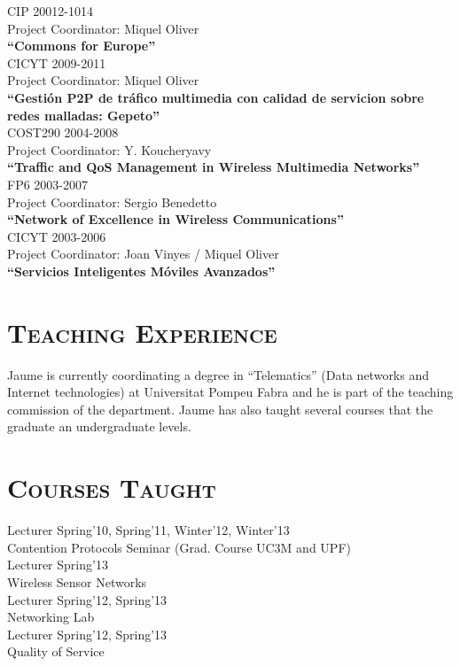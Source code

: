 \documentclass[line,margin]{res}
\begin{document}
\begin{resume}
\hfill {CIP 20012-1014} \\
Project Coordinator: Miquel Oliver\\
\textbf{``Commons for Europe''}\\

\hfill {CICYT 2009-2011} \\
Project Coordinator: Miquel Oliver\\
\textbf{``Gestión P2P de tráfico multimedia con calidad de servicion sobre redes malladas: Gepeto''}\\

\hfill {COST290 2004-2008} \\
Project Coordinator: Y. Koucheryavy\\
\textbf{``Traffic and QoS Management in Wireless Multimedia Networks''}\\

\hfill {FP6 2003-2007} \\
Project Coordinator: Sergio Benedetto\\
\textbf{``Network of Excellence in Wireless Communications''}\\

\hfill {CICYT 2003-2006} \\
Project Coordinator: Joan Vinyes / Miquel Oliver\\
\textbf{``Servicios Inteligentes Móviles Avanzados''}\\

\section{\textsc{Teaching Experience}}
Jaume is currently coordinating a degree in ``Telematics'' (Data networks and Internet technologies) at Universitat Pompeu Fabra and he is part of the teaching commission of the department. Jaume has also taught several courses that the graduate an undergraduate levels.

\section{\textsc{Courses Taught}}
Lecturer
\hfill {Spring'10, Spring'11, Winter'12, Winter'13}\\
Contention Protocols Seminar (Grad. Course UC3M and UPF)\\
\newline
Lecturer
\hfill {Spring'13}\\
Wireless Sensor Networks\\
\newline
Lecturer
\hfill {Spring'12, Spring'13}\\
Networking Lab\\
\newline
Lecturer
\hfill {Spring'12, Spring'13}\\
Quality of Service\\
\newline


\end{resume}
\end{document}
